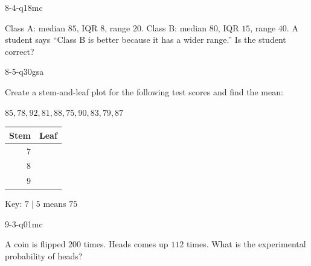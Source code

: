 \begin{practiceQuestion}{8-4-q18}{mc}
\begin{questionText}
Class A: median $85$, IQR $8$, range $20$. Class B: median $80$, IQR $15$, range $40$. A student says ``Class B is better because it has a wider range.'' Is the student correct?
\end{questionText}
\end{practiceQuestion}

\begin{practiceQuestion}{8-5-q30}{gsa}
\begin{questionText}
Create a stem-and-leaf plot for the following test scores and find the mean:

$85, 78, 92, 81, 88, 75, 90, 83, 79, 87$

\begin{center}
\begin{tabular}{r|l}
\textbf{Stem} & \textbf{Leaf} \\
\hline
$7$ & \\
$8$ & \\
$9$ & \\
\end{tabular}

Key: $7 \mid 5$ means $75$
\end{center}
\end{questionText}
\end{practiceQuestion}

\begin{practiceQuestion}{9-3-q01}{mc}
\begin{questionText}
A coin is flipped $200$ times. Heads comes up $112$ times. What is the experimental probability of heads?
\end{questionText}
\end{practiceQuestion}

